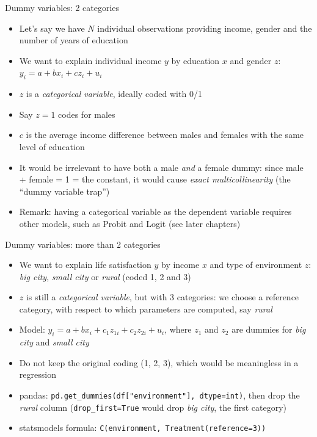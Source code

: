 \documentclass[aspectratio=169]{beamer}
\begin{document}
\begin{frame}{Dummy variables: 2 categories}
\begin{itemize}
    \item Let's say we have $N$ individual observations providing income, gender and the number of years of education
    \item We want to explain individual income $y$ by education $x$ and gender $z$: $y_i = a + b x_i + c z_i + u_i$
    \item $z$ is a \textit{categorical variable}, ideally coded with 0/1
    \item Say $z = 1$ codes for males
    \item $c$ is the average income difference between males and females with the same level of education
    \item It would be irrelevant to have both a male \textit{and} a female dummy: since male + female = 1 = the constant, it would cause \textit{exact multicollinearity} (the ``dummy variable trap'')
    \item Remark: having a categorical variable as the dependent variable requires other models, such as Probit and Logit (see later chapters)
\end{itemize}
\end{frame}

\begin{frame}{Dummy variables: more than 2 categories}
\begin{itemize}
    \item We want to explain life satisfaction $y$ by income $x$ and type of environment $z$: \textit{big city}, \textit{small city} or \textit{rural} (coded 1, 2 and 3)
    \item $z$ is still a \textit{categorical variable}, but with 3 categories: we choose a reference category, with respect to which parameters are computed, say \textit{rural}
    \item Model: $y_i = a + b x_i + c_1 z_{1i} + c_2 z_{2i} + u_i$, where $z_1$ and $z_2$ are dummies for \textit{big city} and \textit{small city}
    \item Do not keep the original coding (1, 2, 3), which would be meaningless in a regression
    \item pandas: \texttt{pd.get\_dummies(df["environment"], dtype=int)}, then drop the \textit{rural} column (\texttt{drop\_first=True} would drop \textit{big city}, the first category)
    \item statsmodels formula: \texttt{C(environment, Treatment(reference=3))}
\end{itemize}
\end{frame}
\end{document}
